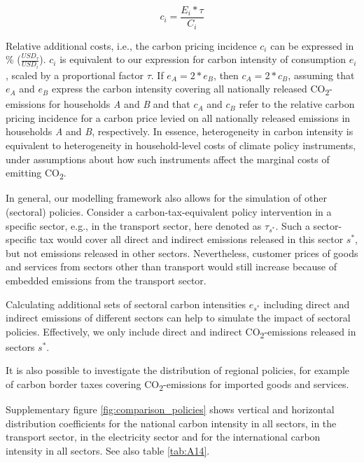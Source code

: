 \documentclass[12pt, a4paper]{article}
\begin{document}
\begin{refsection}
\begin{equation}
    c_{i} = \frac{E_{i}*\tau}{C_{i}}
\end{equation}

Relative additional costs, i.e., the carbon pricing incidence $c_{i}$ can be expressed in \% ($\frac{USD_{\tau}}{USD_{i}}$). $c_{i}$ is equivalent to our expression for carbon intensity of consumption $e_{i}$, scaled by a proportional factor $\tau$. If $e_{A}=2*e_{B}$, then $c_{A}=2*c_{B}$, assuming that $e_{A}$ and $e_{B}$ express the carbon intensity covering all nationally released CO\textsubscript{2}-emissions for households \textit{A} and \textit{B} and that $c_{A}$ and $c_{B}$ refer to the relative carbon pricing incidence for a carbon price levied on all nationally released emissions in households \textit{A} and \textit{B}, respectively. In essence, heterogeneity in carbon intensity is equivalent to heterogeneity in household-level costs of climate policy instruments, under assumptions about how such instruments affect the marginal costs of emitting CO\textsubscript{2}.

In general, our modelling framework also allows for the simulation of other (sectoral) policies. Consider a carbon-tax-equivalent policy intervention in a specific sector, e.g., in the transport sector, here denoted as $\tau_{s^{*}}$. Such a sector-specific tax would cover all direct and indirect emissions released in this sector $s^{*}$, but not emissions released in other sectors. Nevertheless, customer prices of goods and services from sectors other than transport would still increase because of embedded emissions from the transport sector.

Calculating additional sets of sectoral carbon intensities $e_{s^{*}}$ including direct and indirect emissions of different sectors can help to simulate the impact of sectoral policies. Effectively, we only include direct and indirect CO\textsubscript{2}-emissions released in sectors $s^{*}$.

It is also possible to investigate the distribution of regional policies, for example of carbon border taxes covering CO\textsubscript{2}-emissions for imported goods and services. 

Supplementary figure \ref{fig:comparison_policies} shows vertical and horizontal distribution coefficients for the national carbon intensity in all sectors, in the transport sector, in the electricity sector and for the international carbon intensity in all sectors. See also table \ref{tab:A14}.


\end{refsection}
\end{document}
